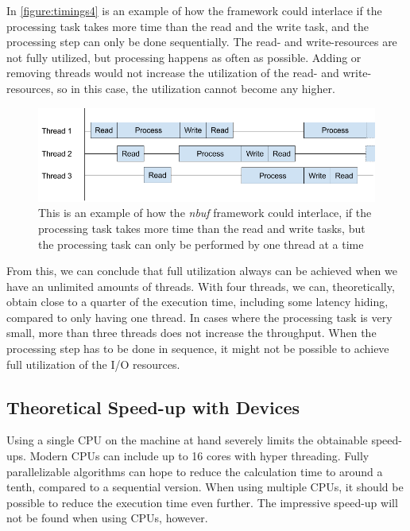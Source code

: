 \documentclass[a4paper]{article}
\newcommand{\nbuf}{\textit{nbuf} }
\begin{document}
In \autoref{figure:timings4} is an example of how the framework could interlace if the processing task takes more time than the read and the write task, and the processing step can only be done sequentially. The read- and write-resources are not fully utilized, but processing happens as often as possible. Adding or removing threads would not increase the utilization of the read- and write-resources, so in this case, the utilization cannot become any higher.\\

\begin{figure}
	\begin{adjustwidth}{-0.5in}{-0.5in}
    \centering
     \includegraphics[scale=0.5]{figures/timings4.png}
  	\caption{This is an example of how the \nbuf framework could interlace, if the processing task takes more time than the read and write tasks, but the processing task can only be performed by one thread at a time}
	\label{figure:timings4}
	\end{adjustwidth}
\end{figure}


From this, we can conclude that full utilization always can be achieved when we have an unlimited amounts of threads. With four threads, we can, theoretically, obtain close to a quarter of the execution time, including some latency hiding, compared to only having one thread. In cases where the processing task is very small, more than three threads does not increase the throughput. When the processing step has to be done in sequence, it might not be possible to achieve full utilization of the I/O resources.


\subsection{Theoretical Speed-up with Devices}
Using a single CPU on the machine at hand severely limits the obtainable speed-ups. Modern CPUs can include up to 16 cores with hyper threading. Fully parallelizable algorithms can hope to reduce the calculation time to around a tenth, compared to a sequential version. When using multiple CPUs, it should be possible to reduce the execution time even further. The impressive speed-up will not be found when using CPUs, however.\\
\end{document}
